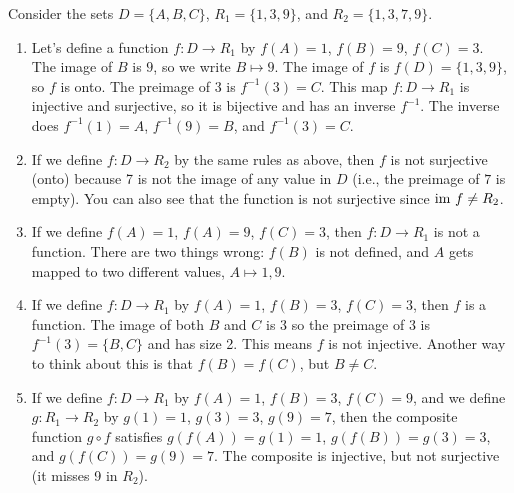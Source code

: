 \begin{example}
Consider the sets $D=\{A,B,C\}$, $R_1=\{1,3,9\}$, and $R_2=\{1,3,7,9\}$.
\begin{enumerate}
	\item Let's define a function $f\colon D\to R_1$ by $f(A)=1$, $f(B)=9$, $f(C)=3$.  The image of $B$ is $9$, so we write $B\mapsto 9$. The image of $f$ is $f(D)=\{1,3,9\}$, so $f$ is onto. The preimage of $3$ is $f^{-1}(3)=C$. This map $f\colon D\to R_1$ is injective and surjective, so it is bijective and has an inverse $f^{-1}$.  The inverse does $f^{-1}(1)=A$, $f^{-1}(9)=B$, and $f^{-1}(3)=C$. 
        \item If we define $f\colon D\to R_2$ by the same rules as above, then $f$ is not surjective (onto) because 7 is not the image of any value in $D$ (i.e., the preimage of $7$ is empty).  You can also see that the function is not surjective since $\text{im } f\neq R_2$.
	\item If we define $f(A)=1$, $f(A)=9$, $f(C)=3$, then $f\colon D\to R_1$ is not a function. There are two things wrong: $f(B)$ is not defined, and $A$ gets mapped to two different values, $A\mapsto 1,9$.
	\item If we define $f\colon D\to R_1$ by $f(A)=1$, $f(B)=3$, $f(C)=3$, then $f$ is a function.  The image of both $B$ and $C$ is $3$ so the preimage of $3$ is $f^{-1}(3)=\{B,C\}$ and has size 2.  This means $f$ is not injective.  Another way to think about this is that $f(B)=f(C)$, but $B\neq C$.
	\item If we define $f\colon D\to R_1$ by $f(A)=1$, $f(B)=3$, $f(C)=9$, and we define $g\colon R_1\to R_2$ by $g(1)=1$, $g(3)=3$, $g(9)=7$, then the composite function $g\circ f$ satisfies $g(f(A))=g(1)=1$, $g(f(B))=g(3)=3$, and $g(f(C))=g(9)=7$. The composite is injective, but not surjective (it misses 9 in $R_2$). 
\end{enumerate}
\end{example}

